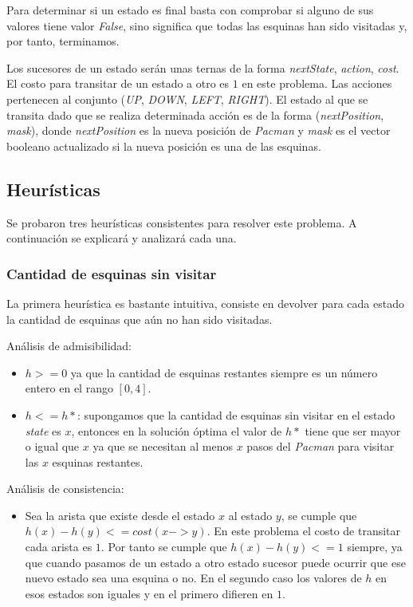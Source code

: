 \documentclass[12pt]{article}
\begin{document}
Para determinar si un estado es final basta con comprobar si alguno de sus valores tiene valor \emph{False}, sino significa que todas las esquinas han sido visitadas y, por tanto, terminamos.

Los sucesores de un estado ser\'an unas ternas de la forma \emph{nextState}, \emph{action}, \emph{cost}. El costo para transitar de un estado a otro es $1$ en este problema. Las acciones pertenecen al conjunto (\emph{UP}, \emph{DOWN}, \emph{LEFT}, \emph{RIGHT}). El estado al que se transita dado que se realiza determinada acci\'on es de la forma (\emph{nextPosition}, \emph{mask}), donde \emph{nextPosition} es la nueva posici\'on de \emph{Pacman} y \emph{mask} es el vector booleano actualizado si la nueva posici\'on es una de las esquinas.

\subsection{Heur\'isticas}

Se probaron tres heur\'isticas consistentes para resolver este problema. A continuaci\'on se explicar\'a y analizar\'a cada una.

\subsubsection{Cantidad de esquinas sin visitar}

La primera heur\'istica es bastante intuitiva, consiste en devolver para cada estado la cantidad de esquinas que a\'un no han sido visitadas.

An\'alisis de admisibilidad:

\begin{itemize}
\item $h >= 0$ ya que la cantidad de esquinas restantes siempre es un n\'umero entero en el rango $[0, 4]$.

\item $h <= h*$: supongamos que la cantidad de esquinas sin visitar en el estado \emph{state} es $x$, entonces en la soluci\'on \'optima el valor de $h*$ tiene que ser mayor o igual que $x$ ya que se necesitan al menos $x$ pasos del \emph{Pacman} para visitar las $x$ esquinas restantes.

\end{itemize}

An\'alisis de consistencia:

\begin{itemize}
\item Sea la arista que existe desde el estado $x$ al estado $y$, se cumple que $h(x) - h(y) <= cost(x->y)$. En este problema el costo de transitar cada arista es $1$. Por tanto se cumple que $h(x) - h(y) <= 1$ siempre, ya que cuando pasamos de un estado a otro estado sucesor puede ocurrir que ese nuevo estado sea una esquina o no. En el segundo caso los valores de $h$ en esos estados son iguales y en el primero difieren en $1$.

\end{itemize}
\end{document}
